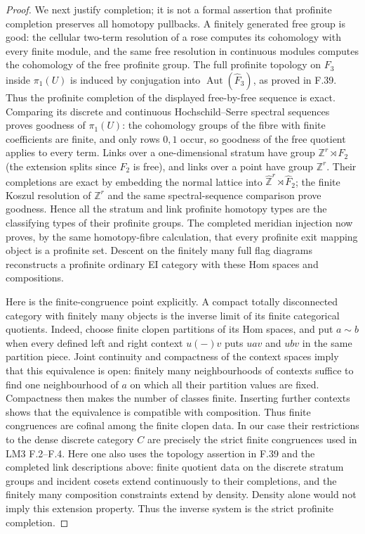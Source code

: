 \begin{proof}
We next justify completion; it is not a formal assertion that profinite
completion preserves all homotopy pullbacks. A finitely generated free
group is good: the cellular two-term resolution of a rose computes its
cohomology with every finite module, and the same free resolution in
continuous modules computes the cohomology of the free profinite group.
The full profinite topology on $F_3$ inside $\pi_1(U)$ is induced by
conjugation into $\operatorname{Aut}(\widehat F_3)$, as proved in F.39.
Thus the profinite completion of the displayed free-by-free sequence is
exact. Comparing its discrete and continuous Hochschild--Serre spectral
sequences proves goodness of $\pi_1(U)$: the cohomology groups of the
fibre with finite coefficients are finite, and only rows $0,1$ occur,
so goodness of the free quotient applies to every term. Links over a
one-dimensional stratum have group $\mathbb Z^r\rtimes F_2$ (the
extension splits since $F_2$ is free), and links over a point have group
$\mathbb Z^r$. Their completions are exact by embedding the normal
lattice into $\widehat{\mathbb Z}^r\rtimes\widehat F_2$; the finite
Koszul resolution of $\mathbb Z^r$ and the same spectral-sequence
comparison prove goodness. Hence all the stratum and link profinite
homotopy types are the classifying types of their profinite groups.
The completed meridian injection now proves, by the same homotopy-fibre
calculation, that every profinite exit mapping object is a profinite
set. Descent on the finitely many full flag diagrams reconstructs a
profinite ordinary EI category with these Hom spaces and compositions.

Here is the finite-congruence point explicitly. A compact totally
disconnected category with finitely many objects is the inverse limit
of its finite categorical quotients. Indeed, choose finite clopen
partitions of its Hom spaces, and put $a\sim b$ when every defined
left and right context $u(-)v$ puts $uav$ and $ubv$ in the same partition
piece. Joint continuity and compactness of the context spaces imply
that this equivalence is open: finitely many neighbourhoods of contexts
suffice to find one neighbourhood of $a$ on which all their partition
values are fixed. Compactness then makes the number of classes finite.
Inserting further contexts shows that the equivalence is compatible
with composition. Thus finite congruences are cofinal among the finite
clopen data. In our case their restrictions to the dense discrete
category $C$ are precisely the strict finite congruences used in LM3
F.2--F.4. Here one also uses the topology assertion in F.39 and the
completed link descriptions above: finite quotient data on the
discrete stratum groups and incident cosets extend continuously to
their completions, and the finitely many composition constraints
extend by density. Density alone would not imply this extension
property. Thus the inverse system is the strict profinite completion.


\end{proof}
